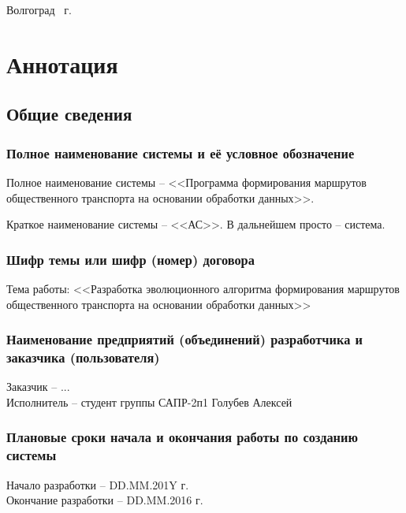 \vspace{\fill}
\begin{center}
    Волгоград \the\year\ г.
\end{center}
\newpage

\stopcontents

\tocless\part{Аннотация}
\newpage

\startcontents[sections]
\setcounter{chapter}{0}
\setlength\parindent{0pt}


\chapter{Общие сведения}
\section{Полное наименование системы и её условное обозначение}
Полное наименование системы -- <<Программа формирования маршрутов 
общественного транспорта на основании обработки данных>>.

Краткое наименование системы -- <<АС>>. В дальнейшем просто -- система.

\section{Шифр темы или шифр (номер) договора}
Тема работы: <<Разработка эволюционного алгоритма формирования маршрутов 
общественного транспорта на основании обработки данных>>

\section{Наименование предприятий (объединений) разработчика и заказчика (пользователя)}
Заказчик -- ...\\
Исполнитель -- студент группы САПР-2п1 Голубев Алексей

\section{Плановые сроки начала и окончания работы по созданию системы}
Начало разработки -- DD.MM.201Y г.\\
Окончание разработки -- DD.MM.2016 г.

